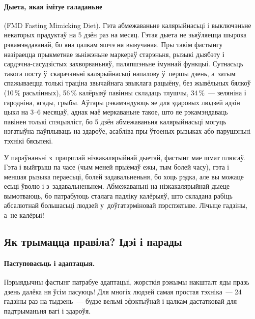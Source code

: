 
\paragraph{Дыета, якая імітуе галаданьне} (FMD Fasting Mimicking Diet).
Гэта абмежаваньне калярыйнасьці і выключэньне некаторых прадуктаў на 5 дзён раз на месяц. Гэтая дыета не зьяўляецца шырока рэкамэндаванай, бо яна цалкам яшчэ ня вывучаная. Пры такім фастынгу назіраецца прыкметнае зьніжэньне маркераў старэньня, рызыкі дыябэту і сардэчна-сасудзістых захворваньняў, паляпшэньне імуннай функцыі. Сутнасьць такога посту ў~скарачэньні калярыйнасьці напалову ў~першы дзень, а~затым спажываецца толькі траціна звычайнага звыклага рацыёну, без жывёльных бялкоў (10\,\% расьлінных), 56\,\% калёрыяў павінны складаць тлушчы, 34\,\%~--- зеляніна і гародніна, ягады, грыбы. Аўтары рэкамэндуюць яе для здаровых людзей адзін цыкл на 3--6 месяцаў, аднак маё меркаваньне такое, што яе рэкамэндаваць павінен толькі спэцыяліст, бо 5 дзён абмежаваньня калярыйнасьці могуць нэгатыўна паўплываць на здароўе, асабліва пры ўтоеных рызыках або парушэньні тэхнікі бясьпекі.

У параўнаньні з~працяглай нізкакалярыйнай дыетай, фастынг мае шмат плюсаў. Гэта і выйгрыш па часе (чым меней прыёмаў ежы, тым болей часу), гэта і меншая рызыка пераесьці, болей задавальненьня, бо хоць рэдка, але вы можаце есьці ўволю і з~задавальненьнем. Абмежаваньні на нізкакалярыйнай дыеце вымотваюць, бо патрабуюць сталага падліку калёрыяў, што складана рабіць абсалютнай большасьці людзей у~доўгатэрміновай пэрспэктыве. Лічыце гадзіны, а~не калёрыі!

\subsection{Як трымацца правіла? Ідэі і парады}

\paragraph{Паступовасьць і адаптацыя.}
Пэрыядычны фастынг патрабуе адаптацыі, жорсткія рэжымы накшталт яды празь дзень далёка ня ўсім пасуюць! Для многіх людзей самая простая тэхніка~--- 24 гадзіны раз на тыдзень~--- будзе вельмі эфэктыўнай і цалкам дастатковай для падтрыманьня вагі і здароўя.

